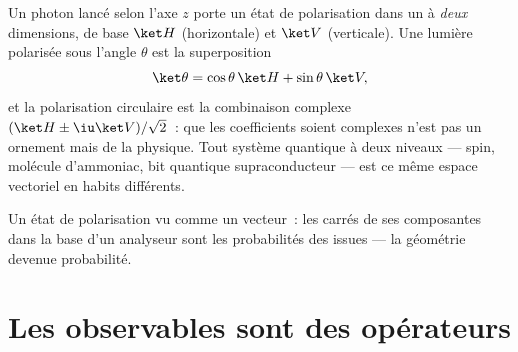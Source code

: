 \begin{example}\label{ex:b3:quantum-formalism:polarization}
Un photon lancé selon l'axe $z$ porte un état de polarisation dans un
 à \emph{deux} dimensions, de base $\ket H$
(horizontale) et $\ket V$ (verticale). Une lumière polarisée sous
l'angle $\theta$ est la superposition
\[
\ket\theta = \cos\theta\,\ket H + \sin\theta\,\ket V ,
\]
et la polarisation circulaire est la combinaison complexe $(\ket H \pm
\iu\ket V)/\sqrt2$~: que les coefficients soient complexes n'est pas
un ornement mais de la physique. Tout système quantique à deux
niveaux --- spin, molécule d'ammoniac, bit quantique supraconducteur
--- est ce même espace vectoriel en habits différents.
\end{example}

\begin{omfigure}

{\small Un état de polarisation vu comme un vecteur~: les carrés de
ses composantes dans la base d'un analyseur sont les probabilités des
issues --- la géométrie devenue probabilité.}
\end{omfigure}

\section{Les observables sont des opérateurs}

